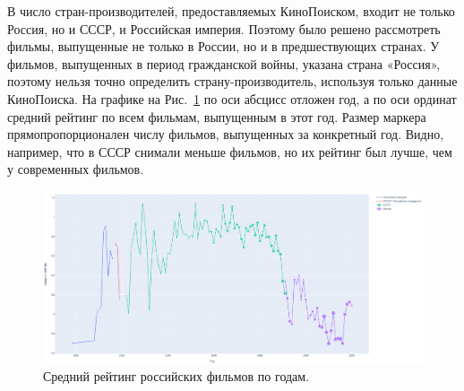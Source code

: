 В число стран-производителей, предоставляемых КиноПоиском, входит не только Россия, но и СССР, и Российская империя. Поэтому было решено рассмотреть фильмы, выпущенные не только в России, но и в предшествующих странах. У фильмов, выпущенных в период гражданской войны, указана страна «Россия», поэтому нельзя точно определить страну-производитель, используя только данные КиноПоиска. На графике на Рис.~\ref{fig:russia_rating} по оси абсцисс отложен год, а по оси ординат средний рейтинг по всем фильмам, выпущенным в этот год. Размер маркера прямопропорционален числу фильмов, выпущенных за конкретный год. Видно, например, что в СССР снимали меньше фильмов, но их рейтинг был лучше, чем у современных фильмов.

\begin{figure}[ht!]
	\includegraphics[width=\linewidth]{../report/images/russia_rating/1}
	\caption{Средний рейтинг российских фильмов по годам.}
	\label{fig:russia_rating}
\end{figure}


